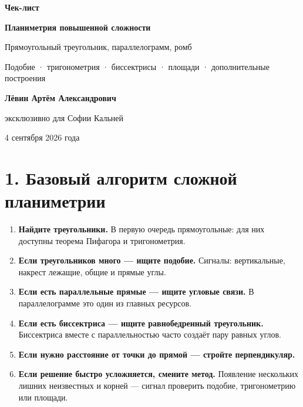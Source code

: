 \documentclass[a4paper,12pt]{article}
\newcommand{\key}[1]{\textbf{\color{darkaccent}#1}}
\begin{document}
\hypersetup{pageanchor=false}
\begin{titlepage}\thispagestyle{empty}\centering
\vspace*{2.4cm}
{\Large\color{darkaccent}\textbf{Чек-лист}}\par\vspace{.7cm}
{\huge\bfseries Планиметрия повышенной сложности}\par\vspace{.35cm}
{\Large Прямоугольный треугольник, параллелограмм, ромб}\par\vspace{1.7cm}
{\large Подобие · тригонометрия · биссектрисы · площади · дополнительные построения}\par\vspace{2.2cm}
{\large\textbf{Лёвин Артём Александрович}}\par\vspace{.25cm}
{\large эксклюзивно для Софии Кальней}\par\vspace{.8cm}
{\large 4 сентября 2026 года}\par\vfill
{}\end{titlepage}
\hypersetup{pageanchor=true}

\section*{\color{darkaccent}1. Базовый алгоритм сложной планиметрии}
\begin{enumerate}[label=\textbf{\arabic*.}]
\item \key{Найдите треугольники.} В первую очередь прямоугольные: для них доступны теорема Пифагора и тригонометрия.
\item \key{Если треугольников много --- ищите подобие.} Сигналы: вертикальные, накрест лежащие, общие и прямые углы.
\item \key{Если есть параллельные прямые --- ищите угловые связи.} В параллелограмме это один из главных ресурсов.
\item \key{Если есть биссектриса --- ищите равнобедренный треугольник.} Биссектриса вместе с параллельностью часто создаёт пару равных углов.
\item \key{Если нужно расстояние от точки до прямой --- стройте перпендикуляр.}
\item \key{Если решение быстро усложняется, смените метод.} Появление нескольких лишних неизвестных и корней --- сигнал проверить подобие, тригонометрию или площади.
\end{enumerate}
\end{document}
